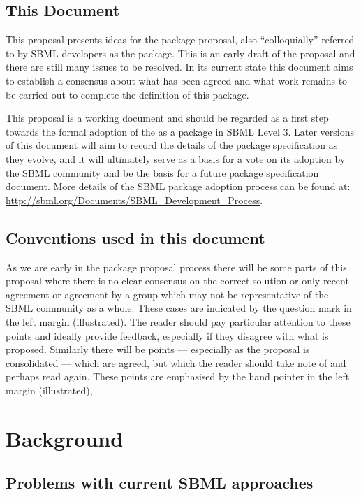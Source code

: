 \documentclass[draftspec]{sbmlpkgspec}
\begin{document}
\subsection{This Document}

This proposal presents ideas for the \distrib package proposal, also
``colloquially'' referred to by SBML developers as the \distribshort
package. This is an early draft of the proposal and there are still
many issues to be resolved. In its current state this document aims to
establish a consensus about what has been agreed and what work remains
to be carried out to complete the definition of this package.

This proposal is a working document and should be regarded as a first
step towards the formal adoption of the \distribshort as a package in
SBML Level 3. Later versions of this document will aim to record the
details of the package specification as they evolve, and it will
ultimately serve as a basis for a vote on its adoption by the SBML
community and be the basis for a future package specification
document. More details of the SBML package adoption process can be
found at: \url{http://sbml.org/Documents/SBML_Development_Process}.

\subsection{Conventions used in this document}

As we are early in the package proposal process there will be some
parts of this proposal where there is no clear consensus on the
correct solution or only recent agreement or agreement by a group
which may not be representative of the SBML community as a
whole. These cases are indicated by the \contraversial question mark
in the left margin (illustrated). The reader should pay particular attention to these
points and ideally provide feedback, especially if they disagree with
what is proposed. Similarly there will be points --- especially as the
proposal is consolidated --- which are agreed, but which the reader
should take note of and perhaps read again. These points \watchout are
emphasised by the hand pointer in the left margin (illustrated),

\section{Background}

\subsection{Problems with current SBML approaches}
\end{document}
